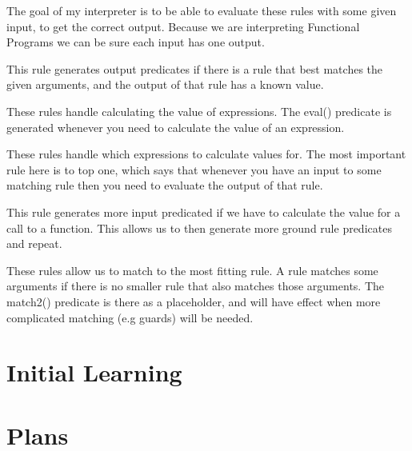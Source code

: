 The goal of my interpreter is to be able to evaluate these rules with some given input, to get the correct output. Because we are interpreting Functional Programs we can be sure each input has one output.



This rule generates output predicates if there is a rule that best matches the given arguments, and the output of that rule has a known value.



These rules handle calculating the value of expressions. The eval() predicate is generated whenever you need to calculate the value of an expression.



These rules handle which expressions to calculate values for. The most important rule here is to top one, which says that whenever you have an input to some matching rule then you need to evaluate the output of that rule.



This rule generates more input predicated if we have to calculate the value for a call to a function. This allows us to then generate more ground rule predicates and repeat.



These rules allow us to match to the most fitting rule. A rule matches some arguments if there is no smaller rule that also matches those arguments. The match2() predicate is there as a placeholder, and will have effect when more complicated matching (e.g guards) will be needed.

\section{Initial Learning}

\section{Plans}

\pagebreak
\renewcommand\bibname{{References}}

